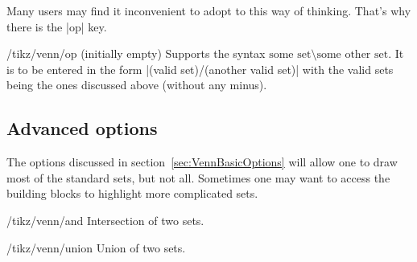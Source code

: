 \documentclass[a4paper]{ltxdoc}
\begin{document}
Many users may find it inconvenient to adopt to this way of thinking. That's why
there is the |op| key. 

\begin{key}{/tikz/venn/op (initially empty)}
        Supports the syntax $\mbox{some set}\setminus\mbox{some other set}$. It
		is to be entered in the form |(valid set)/(another valid set)| with the
		valid sets being the ones discussed above (without any minus).
\end{key}

\begin{codeexample}[width=5cm]
\end{codeexample}

\begin{codeexample}[width=5cm]
\end{codeexample}


\subsection{Advanced options}
\label{sec:VennAdvancedOptions}

The options discussed in section~\ref{sec:VennBasicOptions} will allow one to
draw most of the standard sets, but not all. Sometimes one may want to access
the building blocks to highlight more complicated sets. 

\begin{key}{/tikz/venn/and }
        Intersection of two sets. 
\end{key}

\begin{codeexample}[width=5cm]
\end{codeexample}

\begin{key}{/tikz/venn/union }
        Union of two sets. 
\end{key}

\begin{codeexample}[width=5cm]
\end{codeexample}
\end{document}
